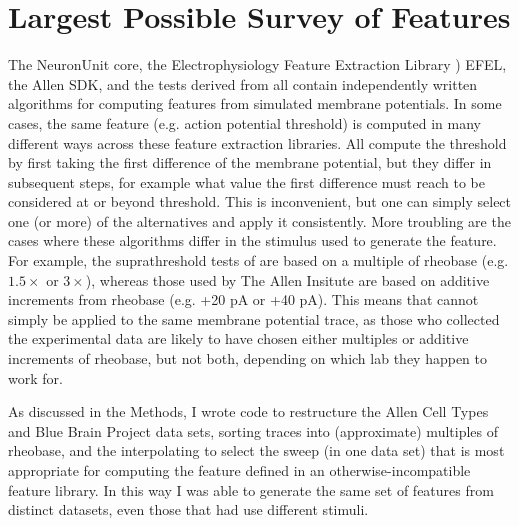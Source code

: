 \section{Largest Possible Survey of Features}
The NeuronUnit core, the Electrophysiology Feature Extraction Library \citep{EFEL}) EFEL, the Allen SDK, and the tests derived from \citep{druckmann2008evaluating} all contain independently written algorithms for computing features from simulated membrane potentials.
In some cases, the same feature (e.g. action potential threshold) is computed in many different ways across these feature extraction libraries.
All compute the threshold by first taking the first difference of the membrane potential, but they differ in subsequent steps, for example what value the first difference must reach to be considered at or beyond threshold.
This is inconvenient, but one can simply select one (or more) of the alternatives and apply it consistently.
More troubling are the cases where these algorithms differ in the stimulus used to generate the feature.
For example, the suprathreshold tests of \citep{druckmann2008evaluating} are based on a multiple of rheobase (e.g. $1.5\times$ or $3\times$), whereas those used by The Allen Insitute are based on additive increments from rheobase (e.g. +20 pA or +40 pA).
This means that cannot simply be applied to the same membrane potential trace, as those who collected the experimental data are likely to have chosen either multiples or additive increments of rheobase, but not both, depending on which lab they happen to work for.

As discussed in the Methods, I wrote code to restructure the Allen Cell Types and Blue Brain Project data sets, sorting traces into (approximate) multiples of rheobase, and the interpolating to select the sweep (in one data set) that is most appropriate for computing the feature defined in an otherwise-incompatible feature library.
In this way I was able to generate the same set of features from distinct datasets, even those that had use different stimuli.

